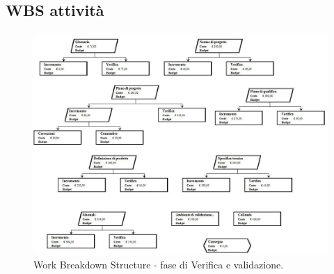 \documentclass[a4paper]{report}
\begin{document}
			\subsection{WBS attività}
				\begin{figure}[H]
					\centering
					\includegraphics[scale=0.5]{WBSValidazione}
					\caption{Work Breakdown Structure - fase di Verifica e validazione.}
				\end{figure}
\end{document}

